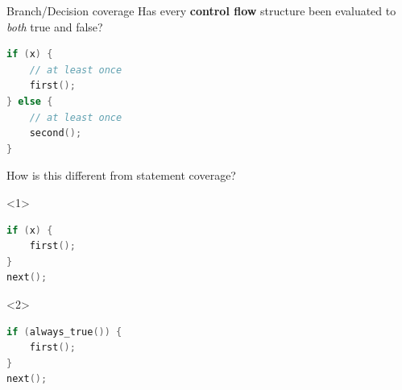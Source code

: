 \documentclass[xcolor = {dvipsnames, table}, aspectratio=169]{beamer}
\begin{document}
\begin{frame}[fragile]
    \begin{block}{Branch/Decision coverage}
        Has every \textbf{control flow} structure been evaluated to \emph{both}
        true and false?
    \end{block}

    \begin{lstlisting}[language = C]
if (x) {
    // at least once
    first();
} else {
    // at least once
    second();
}
    \end{lstlisting}

    \pause
    \begin{block}{}
        How is this different from statement coverage?
    \end{block}
\end{frame}

\begin{frame}[fragile]
    \begin{onlyenv}<1>
        \begin{lstlisting}[language = C]
if (x) {
    first();
}
next();
        \end{lstlisting}
    \end{onlyenv}%
    \begin{onlyenv}<2>
        \begin{lstlisting}[language = C]
if (always_true()) {
    first();
}
next();
        \end{lstlisting}
    \end{onlyenv}%

\end{frame}
\end{document}
